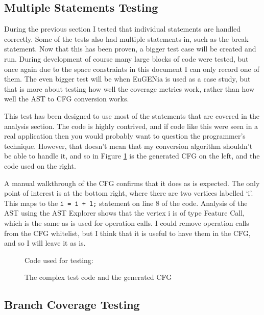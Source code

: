 \subsection{Multiple Statements Testing}

During the previous section I tested that individual statements are handled correctly. Some of the tests also had multiple statements in, such as the break statement. Now that this has been proven, a bigger test case will be created and run. During development of course many large blocks of code were tested, but once again due to the space constraints in this document I can only record one of them. The even bigger test will be when EuGENia is used as a case study, but that is more about testing how well the coverage metrics work, rather than how well the AST to CFG conversion works.

This test has been designed to use most of the statements that are covered in the analysis section. The code is highly contrived, and if code like this were seen in a real application then you would probably want to question the programmer's technique. However, that doesn't mean that my conversion algorithm shouldn't be able to handle it, and so in Figure \ref{fig:testComplex} is the generated CFG on the left, and the code used on the right.

A manual walkthrough of the CFG confirms that it does as is expected. The only point of interest is at the bottom right, where there are two vertices labelled `i'. This maps to the \verb|i = i + 1;| statement on line 8 of the code. Analysis of the AST using the AST Explorer shows that the vertex i is of type Feature Call, which is the same as is used for operation calls. I could remove operation calls from the CFG whitelist, but I think that it is useful to have them in the CFG, and so I will leave it as is.

\begin{figure}
\begin{minipage}{.6\textwidth}
\centering
\end{minipage}
\begin{minipage}{.39\textwidth}
  \centering
  Code used for testing:
  
\end{minipage}
\caption{The complex test code and the generated CFG}
\label{fig:testComplex}
\end{figure}


\subsection{Branch Coverage Testing}

